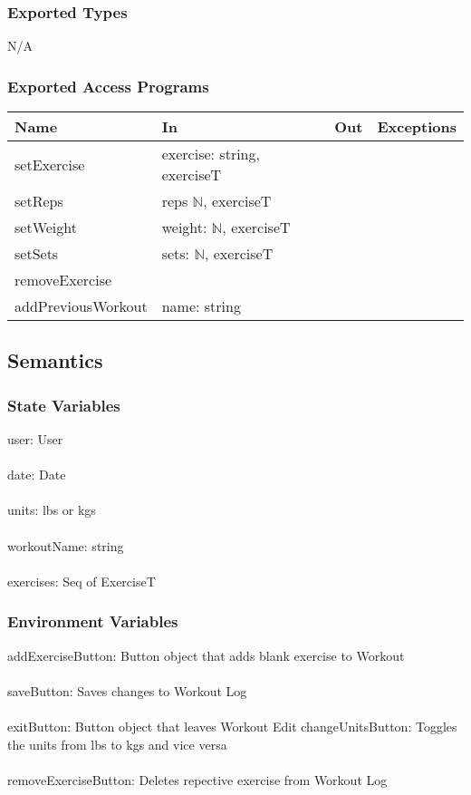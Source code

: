 \documentclass[12pt, titlepage]{article}
\begin{document}
\subsubsection{Exported Types}
N/A

\subsubsection{Exported Access Programs}

\begin{tabular}{| l | l | l | l |}
	\hline
	{\textbf{Name}} & {\textbf{In}} & {\textbf{Out}} & {\textbf{Exceptions}}\\
	\hline
	{setExercise} & exercise: string, exerciseT & & \\
	\hline
	{setReps} & reps $\mathbb{N}$, exerciseT & & \\
	\hline
	{setWeight} & weight: $\mathbb{N}$, exerciseT & & \\
	\hline
	{setSets} & sets: $\mathbb{N}$, exerciseT & &\\
	\hline
	{removeExercise} & & &\\
	\hline
	{addPreviousWorkout} & name: string & &\\
	\hline
\end{tabular}

\subsection{Semantics}

\subsubsection{State Variables}

user: User\\\\
date: Date\\\\
units: lbs or kgs\\\\
workoutName: string\\\\
exercises: Seq of ExerciseT

\subsubsection{Environment Variables}

addExerciseButton: Button object that adds blank exercise to Workout\\\\
saveButton: Saves changes to Workout Log\\\\
exitButton: Button object that leaves Workout Edit
changeUnitsButton: Toggles the units from lbs to kgs and vice versa\\\\
removeExerciseButton: Deletes repective exercise from Workout Log
\end{document}
